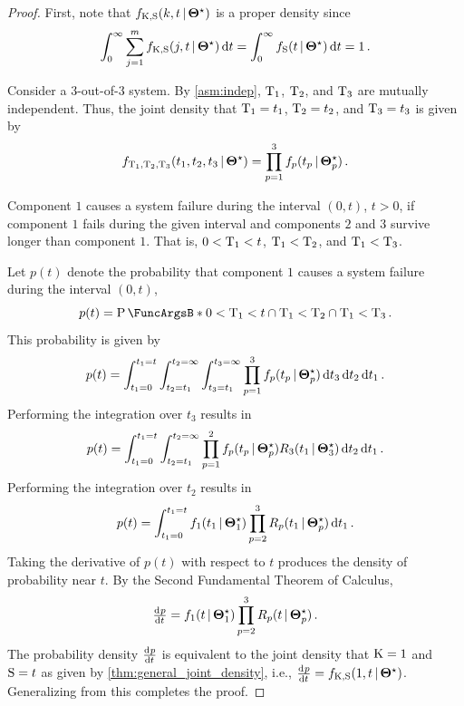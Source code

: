 \documentclass[
    11pt,
    extrafontsizes,
    article,
    oldfontcommands,
    final,
    oneside,
    openany,
    hidelinks]{memoir}
\begin{document}
\begin{proof}
First, note that $f_{\mathrm{K}, \mathrm{S}}(k, t {\,|\,} {\boldsymbol{\Theta}}^{\star})$ is a proper density since
\begin{equation}
    \int_{0}^{\infty} \sum_{j=1}^{m} \pdf_{\RV{K}, \sv}(j, t \given \tparam\sysparam) \dif t = \int_{0}^{\infty} \spdf(t \given \tparam\sysparam) \dif t = 1\,.
\end{equation}

Consider a $3$-out-of-$3$ system. By \cref{asm:indep}, $\mathrm{T}_1$, $\mathrm{T}_2$, and $\mathrm{T}_3$ are mutually independent. Thus, the joint density that $\mathrm{T}_1 = t_1$, $\mathrm{T}_2 = t_2$, and $\mathrm{T}_3 = t_3$ is given by
\begin{equation}
    f_{\mathrm{T}_1, \mathrm{T}_2, \mathrm{T}_3}(t_1, t_2, t_3 {\,|\,} {\boldsymbol{\Theta}}^{\star}) =
        \prod_{p=1}^{3} f_p(t_p {\,|\,} {\boldsymbol{\Theta}}^{\star}_p)\,.
\end{equation}

Component $1$ causes a system failure during the interval $(0, t)$, $t > 0$, if component $1$ fails during the given interval and components $2$ and $3$ survive longer than component $1$. That is, $0 < \mathrm{T}_1 < t$, $\mathrm{T}_1 < \mathrm{T}_2$, and $\mathrm{T}_1 < \mathrm{T}_3$.

Let $p(t)$ denote the probability that component $1$ causes a system failure during the interval $(0, t)$,
\begin{equation}
    p(t) = \Prob{0 < \cv_1 < t \cap \cv_1 < \cv_2 \cap \cv_1 < \cv_3}\,.
\end{equation}
This probability is given by
\begin{equation}
    p(t) = \int_{t_1=0}^{t_1=t} \int_{t_2=t_1}^{t_2=\infty} \int_{t_3=t_1}^{t_3=\infty}
    \prod_{p=1}^{3} \pdf_p(t_p \given \tparam{\sysparam}_p) \dif t_3 \dif t_2 \dif t_1\,.
\end{equation}
Performing the integration over $t_3$ results in
\begin{equation}
    p(t) = \int_{t_1=0}^{t_1=t} \int_{t_2=t_1}^{t_2=\infty}
    \prod_{p=1}^{2} \pdf_p(t_p \given \tparam{\sysparam}_p)
    \srv_3(t_1 \given \tparam{\sysparam}_3) \dif t_2 \dif t_1\,.
\end{equation}
Performing the integration over $t_2$ results in
\begin{equation}
    p(t) = \int_{t_1=0}^{t_1=t} \pdf_1(t_1 \given \tparam{\sysparam}_1)
    \prod_{p=2}^{3} \srv_p(t_1 \given \tparam{\sysparam}_p) \dif t_1\,.
\end{equation}
Taking the derivative of $p(t)$ with respect to $t$ produces the density of probability near $t$. By the Second Fundamental Theorem of Calculus,
\begin{equation}
    \od{p}{t} = \pdf_1(t \given \tparam{\sysparam}_1) \prod_{p=2}^{3} \srv_p(t \given \tparam{\sysparam}_p)\,.
\end{equation}
The probability density $\od{p}{t}$ is equivalent to the joint density that $\mathrm{K} = 1$ and $\mathrm{S} = t$ as given by \cref{thm:general_joint_density}, i.e., $\od{p}{t} = \pdf_{\RV{K}, \sv}(1, t \given \tparam{\sysparam})$. Generalizing from this completes the proof.
\end{proof}
\end{document}
